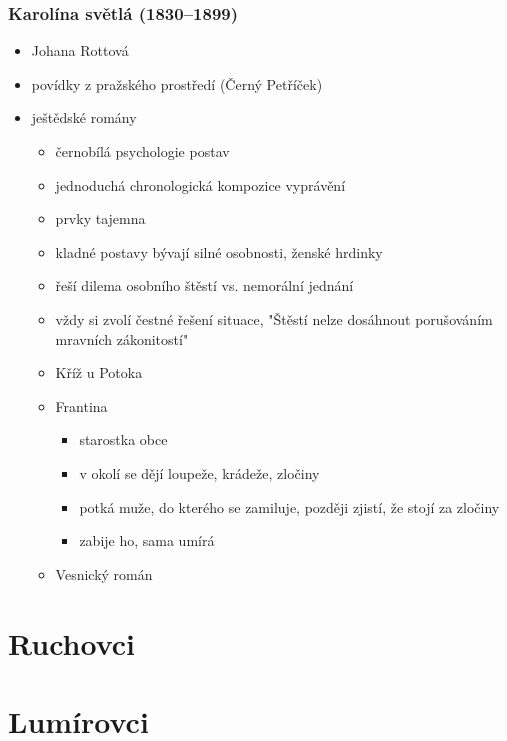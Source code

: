 \subsubsection{Karolína světlá (1830--1899)}
\begin{itemize}
\item Johana Rottová
\item povídky z pražského prostředí (Černý Petříček)
\item ještědské romány 
	\begin{itemize}
	\item černobílá psychologie postav
	\item jednoduchá chronologická kompozice vyprávění
	\item prvky tajemna
	\item kladné postavy bývají silné osobnosti, ženské hrdinky
	\item řeší dilema osobního štěstí vs. nemorální jednání
	\item vždy si zvolí čestné řešení situace, "Štěstí nelze dosáhnout porušováním mravních zákonitostí"
	\item Kříž u Potoka
	\item Frantina
		\begin{itemize}
		\item starostka obce
		\item v okolí se dějí loupeže, krádeže, zločiny
		\item potká muže, do kterého se zamiluje, později zjistí, že stojí za zločiny
		\item zabije ho, sama umírá
		\end{itemize}
	\item Vesnický román
	\end{itemize}
\end{itemize}


\section{Ruchovci}
\section{Lumírovci}
